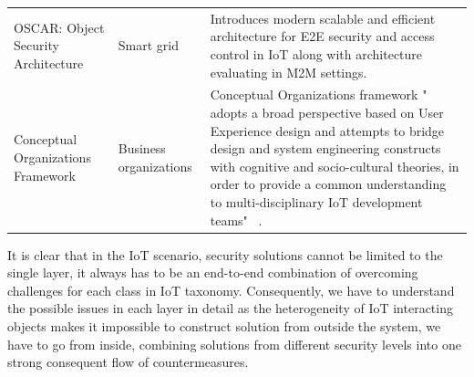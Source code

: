 \documentclass[12pt]{article}
\begin{document}
\begin{center}
\begin{longtable}{ p{4cm} p{3cm} p{7cm} }
		OSCAR: Object Security Architecture & Smart grid & Introduces modern scalable and efficient architecture for E2E security and access control in IoT along with architecture evaluating in M2M settings.\\ [6pt]
		
		Conceptual Organizations Framework & Business organizations & Conceptual Organizations framework " adopts a broad perspective based on User Experience design and attempts to bridge design and system engineering constructs with cognitive and socio-cultural theories, in order to provide a common understanding to multi-disciplinary IoT development teams" ~\cite{Concept}. \\[6pt]
		\hline  
	\end{longtable}
\end{center}

It is clear that in the IoT scenario, security solutions cannot be limited to the single layer, it always has to be an end-to-end combination of overcoming challenges for each class in IoT taxonomy. Consequently, we have to understand the possible issues in each layer in detail as the heterogeneity of IoT interacting objects makes it impossible to construct solution from outside the system, we have to go from inside, combining solutions from different security levels into one strong consequent flow of countermeasures. 
\end{document}
